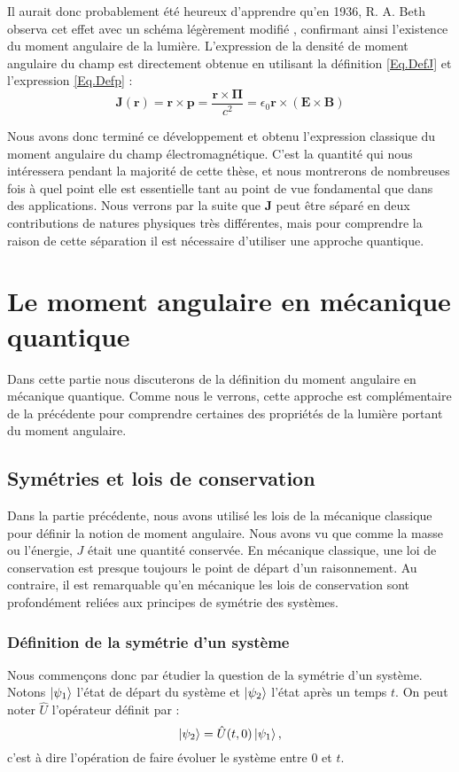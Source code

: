 Il aurait donc probablement été heureux d'apprendre qu'en 1936, R. A. Beth observa cet effet avec un schéma légèrement modifié , confirmant ainsi l'existence du moment angulaire de la lumière.
L'expression de la densité de moment angulaire du champ est directement obtenue en utilisant la définition \ref{Eq.DefJ} et l'expression \ref{Eq.Defp} :
\begin{equation}
\bm{J}(\bm{r})=\bm{r}\times\bm{p}=\frac{\bm{r}\times\bm{\Pi}}{c^2} = \epsilon_0\bm{r}\times(\bm{E}\times\bm{B})
\label{Eq.DefJEM}
\end{equation}

Nous avons donc terminé ce développement et obtenu l'expression classique du moment angulaire du champ électromagnétique. C'est la quantité qui nous intéressera pendant la majorité de cette thèse, et nous montrerons de nombreuses fois à quel point elle est essentielle tant au point de vue fondamental que dans des applications. Nous verrons par la suite que $\bm{J}$ peut être séparé en deux contributions de natures physiques très différentes, mais pour comprendre la raison de cette séparation il est nécessaire d'utiliser une approche quantique. 

\section{Le moment angulaire en mécanique quantique}
Dans cette partie nous discuterons de la définition du moment angulaire en mécanique quantique. Comme nous le verrons, cette approche est complémentaire de la précédente pour comprendre certaines des propriétés de la lumière portant du moment angulaire. 

\subsection{Symétries et lois de conservation}

Dans la partie précédente, nous avons utilisé les lois de la mécanique classique pour définir la notion de moment angulaire. Nous avons vu que comme la masse ou l'énergie, $J$ était une quantité conservée. En mécanique classique, une loi de conservation est presque toujours le point de départ d'un raisonnement. Au contraire, il est remarquable qu'en mécanique les lois de conservation sont profondément reliées aux principes de symétrie des systèmes. 

\subsubsection{Définition de la symétrie d'un système}
Nous commençons donc par étudier la question de la symétrie d'un système. Notons $\ket{\psi_1}$ l'état de départ du système et $\ket{\psi_2}$ l'état après un temps $t$. On peut noter $\hat{U}$ l'opérateur définit par :
\begin{equation*}
\ket{\psi_2}=\hat{U}(t,0)\ket{\psi_1},
\end{equation*}
c'est à dire l'opération de faire évoluer le système entre 0 et $t$.

